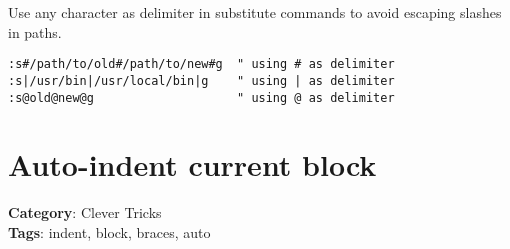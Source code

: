 Use any character as delimiter in substitute commands to avoid escaping slashes in paths.

\begin{Exa*}{}
\begin{Verbatim}[fontsize=\footnotesize, breaklines, breakanywhere]
:s#/path/to/old#/path/to/new#g  " using # as delimiter
:s|/usr/bin|/usr/local/bin|g    " using | as delimiter
:s@old@new@g                    " using @ as delimiter
\end{Verbatim}
\end{Exa*}

\section{Auto-indent current block}

\textbf{Category}: Clever Tricks\\ \textbf{Tags}: indent, block, braces, auto
\vspace{0.5cm}

